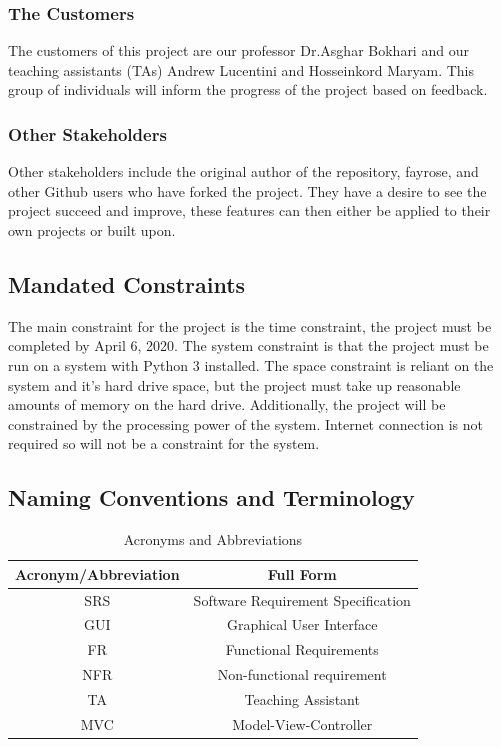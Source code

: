 \documentclass[12pt, titlepage]{article}
\begin{document}
\subsubsection{The Customers}
    The customers of this project are our professor Dr.Asghar Bokhari and our
    teaching assistants (TAs) Andrew Lucentini and Hosseinkord Maryam. This group of individuals will inform the progress of the project based on feedback.
\subsubsection{Other Stakeholders}
    Other stakeholders include the original author of the repository, fayrose, and other Github users who have forked the project. They have a desire to see the project succeed and improve, these features can then either be applied to their own projects or built upon.
    
\subsection{Mandated Constraints}
    The main constraint for the project is the time constraint, the project must be completed by April 6, 2020. The system constraint is that the project must be run on a system with Python 3 installed. The space constraint is reliant on the system and it's hard drive space, but the project must take up reasonable amounts of memory on the hard drive. Additionally, the project will be constrained by the processing power of the system. Internet connection is not required so will not be a constraint for the system.

\subsection{Naming Conventions and Terminology}
\begin{table}[!htb]
    \centering
    \caption{Acronyms and Abbreviations}
    \begin{tabular}{|c|c|}
        \hline
        Acronym/Abbreviation & Full Form \\
        \hline
        SRS & Software Requirement Specification\\
        GUI & Graphical User Interface \\
        FR & Functional Requirements \\
        NFR & Non-functional requirement\\
        TA & Teaching Assistant\\
        MVC & Model-View-Controller\\
        \hline
    \end{tabular}
\end{table}
\end{document}
